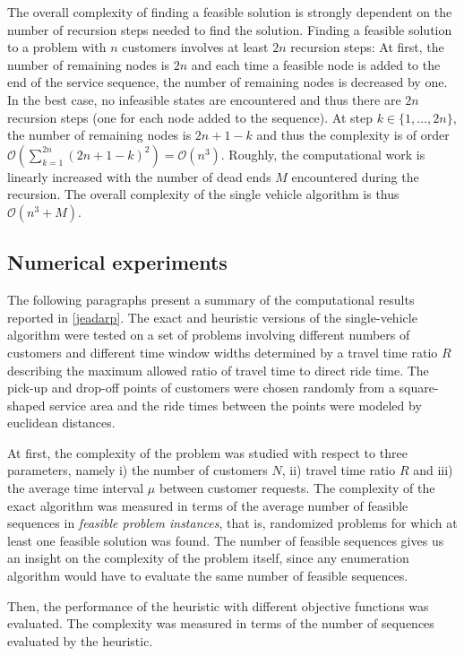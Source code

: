 \documentclass[dissertation,draft*]{aaltoseries}
\begin{document}
The overall complexity of finding a feasible solution is strongly dependent on the number of recursion
steps needed to find the solution. 
Finding a feasible solution to a problem with $n$ customers involves at least $2n$
recursion steps: At first, the number of remaining nodes is $2n$ and each time 
a feasible node is added to the end of the service sequence, the 
number of remaining nodes is decreased by one.
In the best case, no infeasible states are encountered and thus there are $2n$ recursion steps 
(one for each node added to the sequence).
At step $k \in \{1,\ldots,2n\}$, the number of remaining nodes is $2n+1-k$
and thus the complexity is of order $\mathcal{O} (\sum_{k=1}^{2n} (2n+1-k)^2) =\mathcal{O}(n^3)$.
Roughly, the computational work is linearly increased with the 
number of dead ends $M$ encountered during the recursion.
The overall complexity of the single vehicle algorithm is thus $\mathcal{O}(n^3 + M)$.



\subsection{Numerical experiments}
\label{svexperience}
The following paragraphs present a summary of the computational results reported in \ref{jeadarp}. 
The exact and heuristic versions of the single-vehicle algorithm
were tested on a set of problems involving different numbers of customers and different time
window widths determined by a travel time ratio $R$ describing the maximum allowed ratio of travel time
to direct ride time. The pick-up and drop-off points of customers were chosen randomly from a
square-shaped service area and the ride times between the points were modeled by euclidean distances.

At first, the complexity of the problem was studied with respect to three parameters, namely
i) the number of customers $N$, ii) travel time ratio $R$ and iii) the average time interval $\mu$
between customer requests. The complexity of the exact algorithm was measured in terms of the
average number of feasible sequences
in \emph{feasible problem instances}, that is, randomized
problems for which at least one feasible solution was found. 
The number of feasible sequences gives us an insight on the complexity of the problem itself,
since any enumeration algorithm would have to evaluate the same number of feasible sequences.

Then, the performance of the heuristic with different objective functions was evaluated.
The complexity was measured in terms of the number of sequences evaluated by the heuristic.
\end{document}
